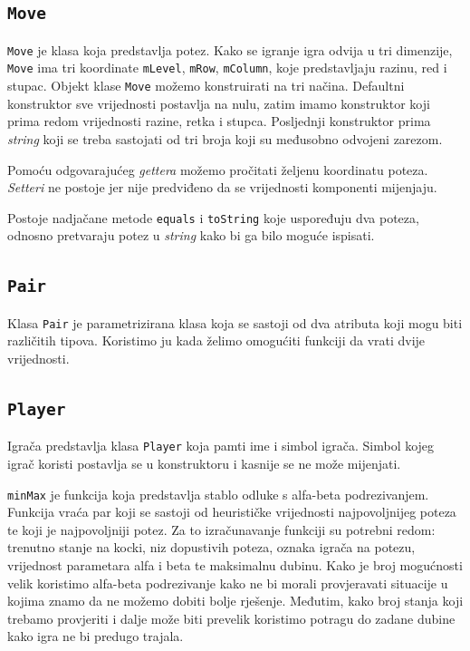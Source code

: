 \documentclass[12pt]{scrartcl}
\begin{document}
\subsection{\texttt{Move}}\label{subsec:m}
\texttt{Move} je klasa koja predstavlja potez. Kako se igranje igra odvija u tri dimenzije, \texttt{Move} ima tri koordinate \texttt{mLevel}, \texttt{mRow}, \texttt{mColumn}, koje predstavljaju razinu, red i stupac. Objekt klase \texttt{Move} možemo konstruirati na tri načina. Defaultni konstruktor sve vrijednosti postavlja na nulu, zatim imamo konstruktor koji prima redom vrijednosti razine, retka i stupca. Posljednji konstruktor prima \emph{string} koji se treba sastojati od tri broja koji su međusobno odvojeni zarezom. 

Pomoću odgovarajućeg \emph{gettera} možemo pročitati željenu koordinatu poteza. \emph{Setteri} ne postoje jer nije predviđeno da se vrijednosti komponenti mijenjaju.

Postoje nadjačane metode \texttt{equals} i \texttt{toString} koje uspoređuju dva poteza, odnosno pretvaraju potez u \emph{string} kako bi ga bilo moguće ispisati.

\subsection{\texttt{Pair}}
Klasa \texttt{Pair} je parametrizirana klasa koja se sastoji od dva atributa koji mogu biti različitih tipova. Koristimo ju kada želimo omogućiti funkciji da vrati dvije vrijednosti.

\subsection{\texttt{Player}}
Igrača predstavlja klasa \texttt{Player} koja pamti ime i simbol igrača. Simbol kojeg igrač koristi postavlja se u konstruktoru i kasnije se ne može mijenjati.

\texttt{minMax} je funkcija koja predstavlja stablo odluke s alfa-beta podrezivanjem. Funkcija vraća par koji se sastoji od heurističke vrijednosti najpovoljnijeg poteza te koji je najpovoljniji potez. Za to izračunavanje funkciji su potrebni redom: trenutno stanje na kocki, niz dopustivih poteza, oznaka igrača na potezu, vrijednost parametara alfa i beta te maksimalnu dubinu. Kako je broj mogućnosti velik koristimo alfa-beta podrezivanje kako ne bi morali provjeravati situacije u kojima znamo da ne možemo dobiti bolje rješenje. Međutim, kako broj stanja koji trebamo provjeriti i dalje može biti prevelik koristimo potragu do zadane dubine kako igra ne bi predugo trajala.
\end{document}
